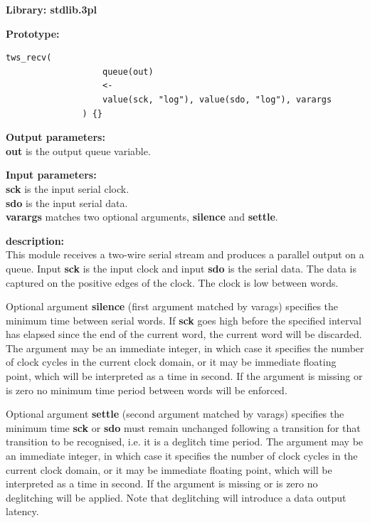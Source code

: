             {\bf Library: stdlib.3pl}


            {\bf Prototype:} \\
            \vsp
            \begin{lstlisting}[gobble=12, language=threepl]
               tws_recv(
                   queue(out)
                   <-
                   value(sck, "log"), value(sdo, "log"), varargs
               ) {}
            \end{lstlisting}

            {\bf Output parameters:} \\
            {\bf out} is the output queue variable.

            {\bf Input parameters:} \\
            {\bf sck} is the input serial clock. \\
            {\bf sdo} is the input serial data. \\
            {\bf varargs} matches two optional arguments, {\bf silence} and
            {\bf settle}.

            {\bf description:} \\
            This module receives a two-wire serial stream and produces
            a parallel output on a queue. Input {\bf sck} is the input clock
            and input {\bf sdo} is the serial data. The data is captured
            on the positive edges of the clock. The clock is low between
            words.
            
            Optional argument {\bf silence} (first argument matched by varags)
            specifies the minimum time between serial words. If {\bf sck}
            goes high before the specified interval has elapsed since the end
            of the current word, the current word will be discarded. The
            argument may be an immediate integer, in which case it specifies
            the number of clock cycles in the current clock domain, or it
            may be immediate floating point, which will be interpreted as
            a time in second. If the argument is missing or is zero no
            minimum time period between words will be enforced.
            
            Optional argument {\bf settle} (second argument matched by varags)
            specifies the minimum time {\bf sck} or {\bf sdo} must remain
            unchanged following a transition for that transition to be
            recognised, i.e. it is a deglitch time period. The argument may be
            an immediate integer, in which case it specifies the number of clock
            cycles in the current clock domain, or it may be immediate floating
            point, which will be interpreted as a time in second. If the argument
            is missing or is zero no deglitching will be applied. Note that
            deglitching will introduce a data output latency.
            
